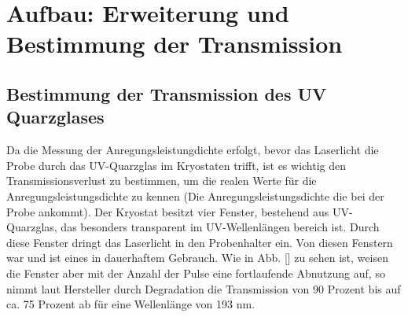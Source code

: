\chapter{Aufbau: Erweiterung und Bestimmung der Transmission }
\thispagestyle{fancy}

\section{Bestimmung der Transmission des UV Quarzglases}

Da die Messung der Anregungsleistungdichte erfolgt, bevor das Laserlicht die Probe durch das UV-Quarzglas im Kryostaten trifft, ist es wichtig den Transmissionsverlust zu bestimmen, um die realen Werte für die Anregungsleistungsdichte zu kennen (Die Anregungsleistungsdichte die bei der Probe ankommt). Der Kryostat besitzt vier Fenster, bestehend aus UV-Quarzglas, das besonders transparent im UV-Wellenlängen bereich ist. Durch diese Fenster dringt das Laserlicht in den Probenhalter ein. Von diesen Fenstern war und ist eines in dauerhaftem Gebrauch. Wie in Abb. [] zu sehen ist, weisen die Fenster aber mit der Anzahl der Pulse eine fortlaufende Abnutzung auf, so nimmt laut Hersteller durch Degradation die Transmission von 90 Prozent bis auf ca. 75 Prozent ab für eine Wellenlänge von 193 nm. 


